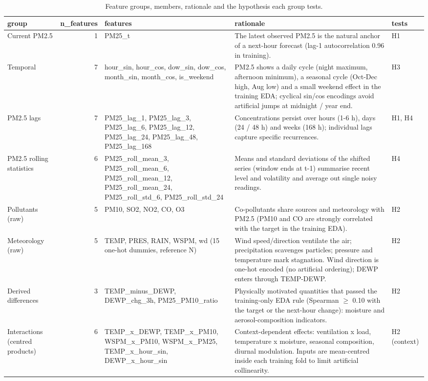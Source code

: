 \begin{table}[t]
\centering
\small
\caption{Feature groups, members, rationale and the hypothesis each group tests.}
\label{tab:table_2_feature_groups_and_rationale}
\begin{tabular}{lrp{4.6cm}p{6.4cm}l}
\toprule
group & n\_features & features & rationale & tests \\
\midrule
Current PM2.5 & 1 & PM25\_t & The latest observed PM2.5 is the natural anchor of a next-hour forecast (lag-1 autocorrelation 0.96 in training). & H1 \\
Temporal & 7 & hour\_sin, hour\_cos, dow\_sin, dow\_cos, month\_sin, month\_cos, is\_weekend & PM2.5 shows a daily cycle (night maximum, afternoon minimum), a seasonal cycle (Oct-Dec high, Aug low) and a small weekend effect in the training EDA; cyclical sin/cos encodings avoid artificial jumps at midnight / year end. & H3 \\
PM2.5 lags & 7 & PM25\_lag\_1, PM25\_lag\_3, PM25\_lag\_6, PM25\_lag\_12, PM25\_lag\_24, PM25\_lag\_48, PM25\_lag\_168 & Concentrations persist over hours (1-6 h), days (24 / 48 h) and weeks (168 h); individual lags capture specific recurrences. & H1, H4 \\
PM2.5 rolling statistics & 6 & PM25\_roll\_mean\_3, PM25\_roll\_mean\_6, PM25\_roll\_mean\_12, PM25\_roll\_mean\_24, PM25\_roll\_std\_6, PM25\_roll\_std\_24 & Means and standard deviations of the shifted series (window ends at t-1) summarise recent level and volatility and average out single noisy readings. & H4 \\
Pollutants (raw) & 5 & PM10, SO2, NO2, CO, O3 & Co-pollutants share sources and meteorology with PM2.5 (PM10 and CO are strongly correlated with the target in the training EDA). & H2 \\
Meteorology (raw) & 5 & TEMP, PRES, RAIN, WSPM, wd (15 one-hot dummies, reference N) & Wind speed/direction ventilate the air; precipitation scavenges particles; pressure and temperature mark stagnation. Wind direction is one-hot encoded (no artificial ordering); DEWP enters through TEMP-DEWP. & H2 \\
Derived differences & 3 & TEMP\_minus\_DEWP, DEWP\_chg\_3h, PM25\_PM10\_ratio & Physically motivated quantities that passed the training-only EDA rule (\textbar{}Spearman\textbar{} $\geq$ 0.10 with the target or the next-hour change): moisture and aerosol-composition indicators. & H2 \\
Interactions (centred products) & 6 & TEMP\_x\_DEWP, TEMP\_x\_PM10, WSPM\_x\_PM10, WSPM\_x\_PM25, TEMP\_x\_hour\_sin, DEWP\_x\_hour\_sin & Context-dependent effects: ventilation x load, temperature x moisture, seasonal composition, diurnal modulation. Inputs are mean-centred inside each training fold to limit artificial collinearity. & H2 (context) \\
\bottomrule
\end{tabular}
\end{table}

